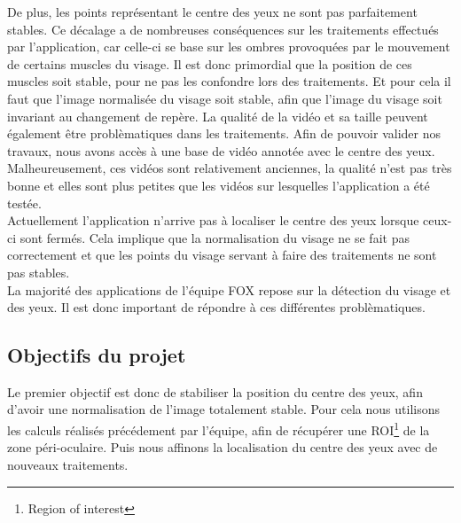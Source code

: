 De plus, les points représentant le centre des yeux ne sont pas parfaitement stables. Ce décalage a de 
nombreuses conséquences sur les traitements effectués par l'application, car celle-ci se base sur 
les ombres provoquées par le mouvement de certains muscles du 
visage. Il est donc primordial que la position de ces muscles soit stable, pour ne pas les confondre
lors des traitements. Et pour cela il faut que l'image normalisée du visage soit stable, afin que l'image
du visage soit invariant au changement de repère.
La qualité de la vidéo et sa taille peuvent également être problèmatiques dans les traitements. Afin de
pouvoir valider nos travaux, nous avons accès à une base de vidéo annotée avec le centre des yeux. 
Malheureusement, ces vidéos sont relativement anciennes, la qualité n'est pas 
très bonne et elles sont plus petites que les vidéos sur lesquelles l'application a été testée.\\

Actuellement l'application n'arrive pas à localiser le centre des yeux lorsque ceux-ci sont fermés. 
Cela implique que la normalisation du visage ne se fait pas correctement et que les points du
visage servant à faire des traitements ne sont pas stables.\\

La majorité des applications de l'équipe FOX repose sur la détection du visage et des yeux. Il est donc 
important de répondre à ces différentes problèmatiques.

\subsection{Objectifs du projet}

Le premier objectif est donc de stabiliser la position du centre des yeux, afin d'avoir une normalisation de l'image
totalement stable. Pour cela nous utilisons les calculs réalisés précédement par l'équipe, 
afin de récupérer une ROI\footnote{Region of interest} de la zone péri-oculaire. Puis
nous affinons la localisation du centre des yeux avec de nouveaux traitements.\\

